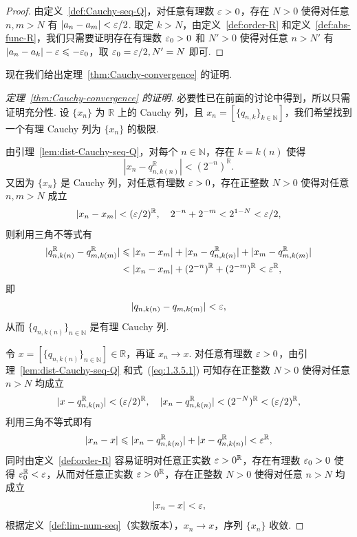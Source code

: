 \documentclass[../main.tex]{subfiles}
\begin{document}
\begin{proof}
    由定义~\ref{def:Cauchy-seq-Q}，对任意有理数 $\varepsilon > 0$，存在 $N > 0$ 使得对任意 $n, m > N$ 有 $|a_n - a_m| < \varepsilon / 2$. 取定 $k > N$，由定义~\ref{def:order-R} 和定义~\ref{def:abs-func-R}，我们只需要证明存在有理数 $\varepsilon_0 > 0$ 和 $N' > 0$ 使得对任意 $n > N'$ 有 $|a_n - a_k| - \varepsilon \leqslant -\varepsilon_0$，取 $\varepsilon_0 = \varepsilon / 2, N' = N$ 即可. 
\end{proof}

现在我们给出定理~\ref{thm:Cauchy-convergence} 的证明. 

\begin{proof}[定理~\ref{thm:Cauchy-convergence} 的证明]
    必要性已在前面的讨论中得到，所以只需证明充分性. 设 $\{x_n\}$ 为 $\mathbb R$ 上的 Cauchy 列，且 $x_n = [\{q_{n, k}\}_{k \in \mathbb N}]$，我们希望找到一个有理 Cauchy 列为 $\{x_n\}$ 的极限. 
    
    
    由引理~\ref{lem:dist-Cauchy-seq-Q}，对每个 $n \in \mathbb N$，存在 $k = k(n)$ 使得 
    \begin{equation} \label{eq:1.3.5.1}
        |x_n - q_{n, k(n)}^\mathbb R| < (2^{-n})^\mathbb R. 
    \end{equation}
    又因为 $\{x_n\}$ 是 Cauchy 列，对任意有理数 $\varepsilon > 0$，存在正整数 $N > 0$ 使得对任意 $n, m > N$ 成立
    $$
    |x_n - x_m| < (\varepsilon / 2)^\mathbb R, \quad 2^{-n} + 2^{-m} < 2^{1 - N} < \varepsilon / 2, 
    $$
    则利用三角不等式有
    \begin{align*}
        |q_{n, k(n)}^\mathbb R - q_{m, k(m)}^\mathbb R| &\leqslant |x_n - x_m| + |x_n - q_{n, k(n)}^\mathbb R| + |x_m - q_{m, k(m)}^\mathbb R| \\
        &< |x_n - x_m| + (2^{-n})^\mathbb R + (2^{-m})^\mathbb R < \varepsilon^\mathbb R, 
    \end{align*}
    即
    $$
    |q_{n, k(n)} - q_{m, k(m)}| < \varepsilon, 
    $$
    从而 $\{q_{n, k(n)}\}_{n \in \mathbb N}$ 是有理 Cauchy 列. 
    
    令 $x = [\{q_{n, k(n)}\}_{n \in \mathbb N}] \in \mathbb R$，再证 $x_n \to x$. 对任意有理数 $\varepsilon > 0$，由引理~\ref{lem:dist-Cauchy-seq-Q} 和式~(\ref{eq:1.3.5.1}) 可知存在正整数 $N > 0$ 使得对任意 $n > N$ 均成立
    $$
    |x - q_{n, k(n)}^\mathbb R| < (\varepsilon / 2)^\mathbb R, \quad |x_n - q_{n, k(n)}^\mathbb R| < (2^{-N})^\mathbb R < (\varepsilon / 2)^\mathbb R, 
    $$
    利用三角不等式即有
    $$
    |x_n - x| \leqslant |x_n - q_{n, k(n)}^\mathbb R| + |x - q_{n, k(n)}^\mathbb R| < \varepsilon^\mathbb R, 
    $$
    同时由定义~\ref{def:order-R} 容易证明对任意正实数 $\varepsilon > 0^\mathbb R$，存在有理数 $\varepsilon_0 > 0$ 使得 $\varepsilon_0^\mathbb R < \varepsilon$，从而对任意正实数 $\varepsilon > 0^\mathbb R$，存在正整数 $N > 0$ 使得对任意 $n > N$ 均成立
    $$
    |x_n - x| < \varepsilon, 
    $$
    根据定义~\ref{def:lim-num-seq}（实数版本），$x_n \to x$，序列 $\{x_n\}$ 收敛. 
\end{proof}
\end{document}
